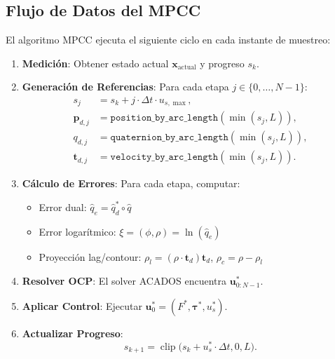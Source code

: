 \documentclass[11pt,a4paper]{article}
\begin{document}
\subsection{Flujo de Datos del MPCC}
\label{subsec:mpcc_dataflow}

El algoritmo MPCC ejecuta el siguiente ciclo en cada instante de muestreo:

\begin{enumerate}
    \item \textbf{Medición}: Obtener estado actual $\mathbf{x}_{\text{actual}}$ y progreso $s_k$.
    
    \item \textbf{Generación de Referencias}: Para cada etapa $j \in \{0, \ldots, N-1\}$:
    \begin{align}
        s_j &= s_k + j \cdot \Delta t \cdot u_{s,\max}, \\
        \mathbf{p}_{d,j} &= \texttt{position\_by\_arc\_length}(\min(s_j, L)), \\
        q_{d,j} &= \texttt{quaternion\_by\_arc\_length}(\min(s_j, L)), \\
        \mathbf{t}_{d,j} &= \texttt{velocity\_by\_arc\_length}(\min(s_j, L)).
    \end{align}
    
    \item \textbf{Cálculo de Errores}: Para cada etapa, computar:
    \begin{itemize}
        \item Error dual: $\hat{q}_e = \hat{q}_d^* \circ \hat{q}$
        \item Error logarítmico: $\xi = (\phi, \rho) = \ln(\hat{q}_e)$
        \item Proyección lag/contour: $\rho_l = (\rho \cdot \mathbf{t}_d) \mathbf{t}_d$, $\rho_c = \rho - \rho_l$
    \end{itemize}
    
    \item \textbf{Resolver OCP}: El solver ACADOS encuentra $\mathbf{u}^*_{0:N-1}$.
    
    \item \textbf{Aplicar Control}: Ejecutar $\mathbf{u}_0^* = (F^*, \boldsymbol{\tau}^*, u_s^*)$.
    
    \item \textbf{Actualizar Progreso}: 
    \begin{equation}
        s_{k+1} = \operatorname{clip}\big(s_k + u_s^* \cdot \Delta t, 0, L\big).
    \end{equation}
\end{enumerate}
\end{document}
